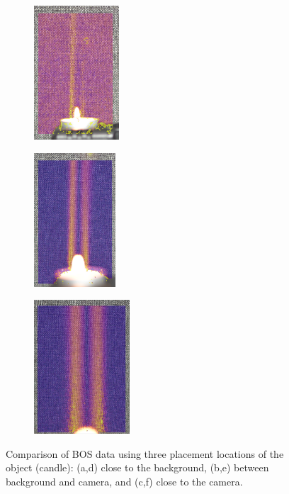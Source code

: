 \documentclass[letterpaper,12pt]{article}
\begin{document}
\begin{figure}[h]
	\begin{subfigure}[b]{0.3\textwidth}
    	\centering
        \includegraphics[height=5cm]{BGDist_Far_0_1.PNG}
        \caption{}
        \label{fig:BOS_BGDist_Far}
    \end{subfigure}
    \begin{subfigure}[b]{0.3\textwidth}
    	\centering
        \includegraphics[height=5cm]{BGDist_Mid_0_2p5.PNG}
        \caption{}
        \label{fig:BOS_BGDist_Mid}
    \end{subfigure}
    \begin{subfigure}[b]{0.3\textwidth}
    	\centering
        \includegraphics[height=5cm]{BGDist_Near_0_3p5.PNG}
        \caption{}
        \label{fig:BOS_BGDist_Near}
    \end{subfigure}
    
    \caption{Comparison of BOS data using three placement locations of the object (candle): (a,d) close to the background, (b,e) between background and camera, and (c,f) close to the camera.}
    \label{fig:Study_BGDist}
\end{figure}
\end{document}
